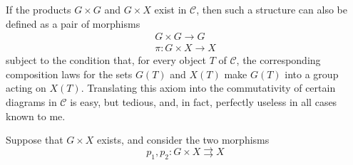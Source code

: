   If the products \(G\times  G\) and \(G\times  X\) exist in \(\mathcal {C}\), then such a structure can also be defined as a pair of morphisms
  \[     \begin {gathered}       G\times  G\to  G     \\\pi \colon  G\times  X\to  X     \end {gathered}   \]
  subject to the condition that, for every object \(T\) of \(\mathcal {C}\), the corresponding composition laws for the sets \(G(T)\) and \(X(T)\) make \(G(T)\) into a group acting on \(X(T)\).
  Translating this axiom into the commutativity of certain diagrams in \(\mathcal {C}\) is easy, but tedious, and, in fact, perfectly useless in all cases known to me.\par{}Suppose that \(G\times  X\) exists, and consider the two morphisms
  \[     p_1,p_2\colon  G\times  X\rightrightarrows  X   \]
  
